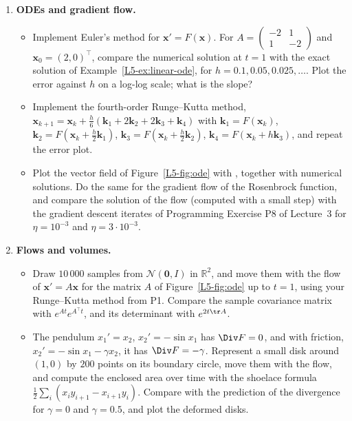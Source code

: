 \begin{enumerate}[label=\textbf{P\arabic*.}, leftmargin=*]
    \item \textbf{ODEs and gradient flow.}
    \begin{itemize}
        \item Implement Euler's method for $\mathbf{x}' = F(\mathbf{x})$. For $A = \begin{pmatrix} -2 & 1 \\ 1 & -2 \end{pmatrix}$ and $\mathbf{x}_0 = (2, 0)^\top$, compare the numerical solution at $t = 1$ with the exact solution of Example~\ref{L5-ex:linear-ode}, for $h = 0.1, 0.05, 0.025, \ldots$. Plot the error against $h$ on a log-log scale; what is the slope?
        \item Implement the fourth-order Runge--Kutta method, $\mathbf{x}_{k+1} = \mathbf{x}_k + \frac{h}{6}(\mathbf{k}_1 + 2\mathbf{k}_2 + 2\mathbf{k}_3 + \mathbf{k}_4)$ with $\mathbf{k}_1 = F(\mathbf{x}_k)$, $\mathbf{k}_2 = F(\mathbf{x}_k + \frac{h}{2}\mathbf{k}_1)$, $\mathbf{k}_3 = F(\mathbf{x}_k + \frac{h}{2}\mathbf{k}_2)$, $\mathbf{k}_4 = F(\mathbf{x}_k + h\mathbf{k}_3)$, and repeat the error plot.
        \item Plot the vector field of Figure~\ref{L5-fig:ode} with , together with numerical solutions. Do the same for the gradient flow of the Rosenbrock function, and compare the solution of the flow (computed with a small step) with the gradient descent iterates of Programming Exercise P8 of Lecture~3 for $\eta = 10^{-3}$ and $\eta = 3 \cdot 10^{-3}$.
    \end{itemize}

    \item \textbf{Flows and volumes.}
    \begin{itemize}
        \item Draw $10\,000$ samples from $\mathcal{N}(\mathbf{0}, I)$ in $\mathbb{R}^2$, and move them with the flow of $\mathbf{x}' = A\mathbf{x}$ for the matrix $A$ of Figure~\ref{L5-fig:ode} up to $t = 1$, using your Runge--Kutta method from P1. Compare the sample covariance matrix with $e^{At}e^{A^\top t}$, and its determinant with $e^{2t\tr A}$.
        \item The pendulum $x_1' = x_2$, $x_2' = -\sin x_1$ has $\Div F = 0$, and with friction, $x_2' = -\sin x_1 - \gamma x_2$, it has $\Div F = -\gamma$. Represent a small disk around $(1, 0)$ by $200$ points on its boundary circle, move them with the flow, and compute the enclosed area over time with the shoelace formula $\frac{1}{2}\sum_i (x_iy_{i+1} - x_{i+1}y_i)$. Compare with the prediction of the divergence for $\gamma = 0$ and $\gamma = 0.5$, and plot the deformed disks.
    \end{itemize}


\end{enumerate}
